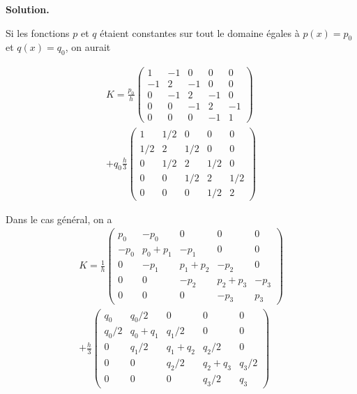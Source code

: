 \documentclass[11pt,a4paper]{report}
\newenvironment{solution}
{
    \vspace{0.5em}
    \begin{mdframed}[backgroundcolor=ThemeLight,leftmargin=0,rightmargin=0,skipabove=0.2em,skipbelow=0.2em]
    \textbf{Solution.}\\[0.5em]
}
{
    \end{mdframed}
    \vspace{0.5em}
}
\begin{document}
\begin{enumerate}[itemsep=0.5em]
{\begin{solution}
\begin{enumerate}
            Si les fonctions $p$ et $q$ étaient constantes sur tout le domaine égales à $p(x)=p_0$ et $q(x)=q_0$, on aurait

            \begin{multline*}
            K = \frac{p_0}{h}
            \begin{pmatrix}
                1 & -1 & 0 & 0 & 0\\
                -1 & 2 & -1 & 0 & 0\\
                0 & -1 & 2 & -1 & 0\\
                0 & 0 & -1 & 2 & -1\\
                0 & 0 & 0 & -1 & 1
            \end{pmatrix} \\ 
            + q_0 \frac{h}{3}
            \begin{pmatrix}
                1 & 1/2 & 0 & 0 & 0\\
                1/2 & 2 & 1/2 & 0 & 0\\
                0 & 1/2 & 2  & 1/2 & 0\\
                0 & 0 & 1/2 & 2 & 1/2\\
                0 & 0 & 0 & 1/2 & 2
            \end{pmatrix}
            \end{multline*}

            Dans le cas général, on a 
            \begin{multline*}
            K = \frac{1}{h}
            \begin{pmatrix}
                p_0 & -p_0 & 0 & 0 & 0\\
                -p_0 & p_0+p_1 & -p_1 & 0 & 0\\
                0 & -p_1 & p_1+p_2 & -p_2 & 0\\
                0 & 0 & -p_2 & p_2+p_3 & -p_3\\
                0 & 0 & 0 & -p_3 & p_3
            \end{pmatrix}\\
            + \frac{h}{3}
            \begin{pmatrix}
                q_0 & q_0/2 & 0 & 0 & 0\\
                q_0/2 & q_0+q_1 & q_1/2 & 0 & 0\\
                0 & q_1/2 & q_1+q_2 & q_2/2 & 0\\
                0 & 0 & q_2/2 & q_2+q_3 & q_3/2\\
                0 & 0 & 0 & q_3/2 & q_3
            \end{pmatrix}
            \end{multline*}


\end{enumerate}
\end{solution}}
\end{enumerate}
\end{document}
